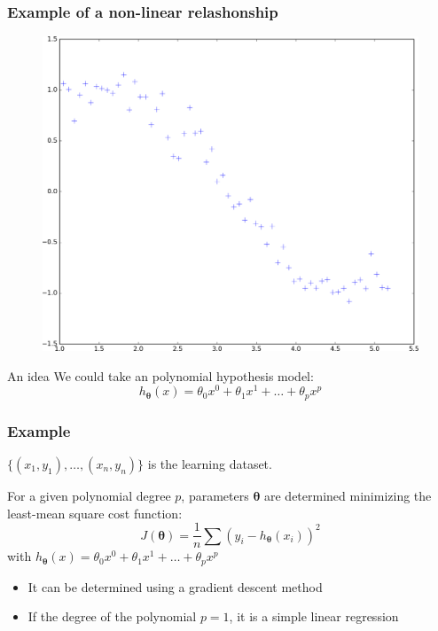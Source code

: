 \documentclass[handout]{beamer}
\begin{document}
\begin{frame}
\frametitle{Example of a non-linear relashonship}
\begin{figure}
\includegraphics[height=0.55\textheight]{./fig/L1/scatter.png}
\end{figure}
\begin{block}{An idea}
We could take an polynomial hypothesis model:
$$
h_{\bm{\theta}}(x) = \theta_0 x^0 + \theta_1 x^1 + \ldots + \theta_p x^p
$$
\end{block}
\end{frame}
\begin{frame}
\frametitle{Example}
$\{(x_1,y_1),\ldots,(x_n,y_n)\}$ is the learning dataset.

For a given polynomial degree $p$, parameters $\bm{\theta}$ are determined minimizing the 
least-mean square cost function:
$$
J(\bm{\theta}) = \frac{1}{n} \sum (y_i - h_{\bm{\theta}}(x_i))^2
$$
with $h_{\bm{\theta}}(x) = \theta_0 x^0 + \theta_1 x^1 + \ldots + \theta_p x^p$
\begin{itemize}[<+->]
\item It can be determined using a gradient descent method
\item If the degree of the polynomial $p=1$, it is a simple linear regression
\end{itemize}
\end{frame}
\end{document}

